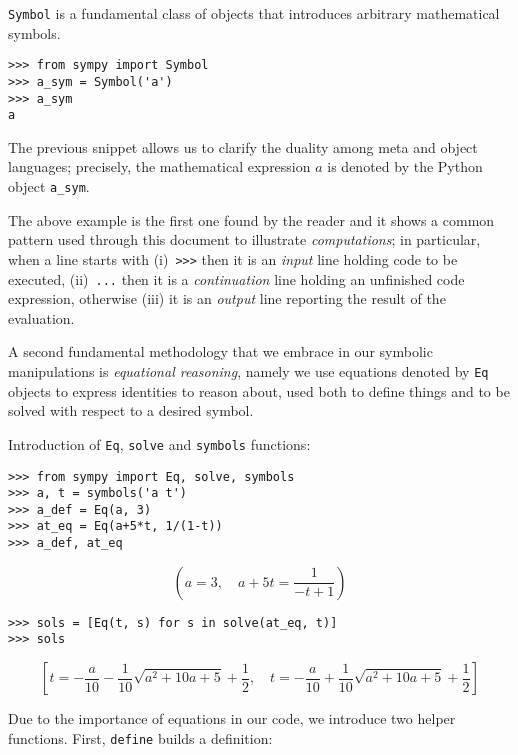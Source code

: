 \begin{example}
\verb|Symbol| is a fundamental class of objects that introduces arbitrary
mathematical symbols.
\begin{verbatim}
>>> from sympy import Symbol
>>> a_sym = Symbol('a')
>>> a_sym
a
\end{verbatim}
The previous snippet allows us to clarify the duality among meta and object
languages; precisely, the mathematical expression $a$ is denoted by the Python
object \verb|a_sym|.
\end{example}

The above example is the first one found by the reader and it shows a common
pattern used through this document to illustrate \textit{computations}; in
particular, when a line starts with (i)~\verb|>>>| then it is an \textit{input}
line holding code to be executed, (ii)~\verb|...| then it is a
\textit{continuation} line holding an unfinished code expression, otherwise
(iii) it is an \textit{output} line reporting the result of the evaluation.

A second fundamental methodology that we embrace in our symbolic manipulations is
\textit{equational reasoning}, namely we use equations denoted by \verb|Eq| objects
to express identities to reason about, used both to define things and
to be solved with respect to a desired symbol.
\begin{example}
Introduction of \verb|Eq|, \verb|solve| and \verb|symbols| functions:
\begin{verbatim}
>>> from sympy import Eq, solve, symbols
>>> a, t = symbols('a t')
>>> a_def = Eq(a, 3)
>>> at_eq = Eq(a+5*t, 1/(1-t))
>>> a_def, at_eq
\end{verbatim}
\begin{displaymath}
\left(
a=3,\quad a + 5 t = \frac{1}{- t + 1}
\right)
\end{displaymath}
\begin{verbatim}
>>> sols = [Eq(t, s) for s in solve(at_eq, t)]
>>> sols
\end{verbatim}
\begin{displaymath}
\left [ t = - \frac{a}{10} - \frac{1}{10} \sqrt{a^{2} + 10 a + 5} + \frac{1}{2}, \quad t = - \frac{a}{10} + \frac{1}{10} \sqrt{a^{2} + 10 a + 5} + \frac{1}{2}\right ]
\end{displaymath}
\end{example}

Due to the importance of equations in our code, we introduce two
helper functions. First, \verb|define| builds a definition:

